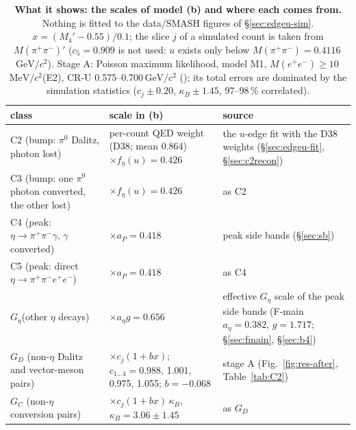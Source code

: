 \documentclass[11pt,a4paper]{article}
\newcommand{\piz}{\ensuremath{\pi^{0}}\xspace}
\newcommand{\pipi}{\ensuremath{\pi^{+}\pi^{-}}\xspace}
\newcommand{\ppee}{\ensuremath{\pi^{+}\pi^{-}e^{+}e^{-}}\xspace}
\newcommand{\Mee}{\ensuremath{M(e^{+}e^{-})}\xspace}
\newcommand{\Mpipi}{\ensuremath{M(\pi^{+}\pi^{-})}\xspace}
\newcommand{\GeVcc}{\ensuremath{\mathrm{GeV}/c^{2}}\xspace}
\newcommand{\MeVcc}{\ensuremath{\mathrm{MeV}/c^{2}}\xspace}
\newcommand{\code}[1]{\texttt{\detokenize{#1}}}
\newcommand{\aEta}{\ensuremath{a_\eta}\xspace}
\newcommand{\aP}{\ensuremath{a_P}\xspace}
\newcommand{\kB}{\ensuremath{\kappa_B}\xspace}
\newcommand{\Geta}{\ensuremath{G_\eta}\xspace}
\begin{document}
\begin{table}[!tbp]
\centering
\caption{\textbf{What it shows: the scales of model (b) and where each comes from.} Nothing is fitted to the data/SMASH figures of
\S\ref{sec:edgeu-sim}. $x=(M_4'-0.55)/0.1$; the slice $j$ of a simulated count is taken from $\Mpipi'$ ($c_5=0.909$ is not used: $u$ exists only
below \Mpipi$=0.4116$\,\GeVcc). Stage A: Poisson maximum likelihood, model M1, \Mee$\ge10$\,\MeVcc (E2), CR-U 0.575--0.700\,\GeVcc
(\code{stageA.txt}); its total errors are dominated by the simulation statistics ($c_j\pm0.20$, $\kB\pm1.45$, 97--98\,\% correlated).}
\label{tab:edgeu-sim-scales}
\small
\begin{tabularx}{\textwidth}{@{}>{\raggedright\arraybackslash}p{5.0cm} >{\raggedright\arraybackslash}p{4.9cm} L@{}}
\toprule
class & scale in (b) & source \\
\midrule
C2 (bump: \piz Dalitz, photon lost) & per-count QED weight (D38; mean 0.864) $\times f_\eta(u)=0.426$ & the $u$-edge fit with the D38 weights
(\S\ref{sec:edgeu-fit}, \S\ref{sec:c2recon}) \\
C3 (bump: one \piz photon converted, the other lost) & $\times f_\eta(u)=0.426$ & as C2 \\
C4 (peak: $\eta\to\pipi\gamma$, $\gamma$ converted) & $\times\aP=0.418$ & peak side bands (\S\ref{sec:sb}) \\
C5 (peak: direct $\eta\to\ppee$) & $\times\aP=0.418$ & as C4 \\
\Geta (other $\eta$ decays) & $\times\aEta g=0.656$ & effective \Geta scale of the peak side bands (F-main $\aEta=0.382$, $g=1.717$;
\S\ref{sec:fmain}, \S\ref{sec:b4}) \\
$G_D$ (non-$\eta$ Dalitz and vector-meson pairs) & $\times c_j(1+bx)$; $c_{1\ldots4}=0.988$, 1.001, 0.975, 1.055; $b=-0.068$ & stage A
(Fig.~\ref{fig:res-after}, Table~\ref{tab:C2}) \\
$G_C$ (non-$\eta$ conversion pairs) & $\times c_j(1+bx)\,\kB$, $\kB=3.06\pm1.45$ & as $G_D$ \\
\bottomrule
\end{tabularx}
\end{table}
\end{document}
